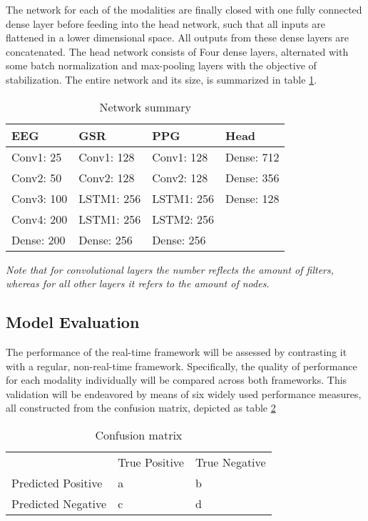 \documentclass{article}
\begin{document}
The network for each of the modalities are finally closed with one fully connected dense layer before feeding into the head network, such that all inputs are flattened in a lower dimensional space. All outputs from these dense layers are concatenated. The head network consists of Four dense layers, alternated with some batch normalization and max-pooling layers with the objective of stabilization. The entire network and its  size, is summarized in table \ref{table:networksummary}.
\bigskip

\bgroup
\def\arraystretch{1.6}%
\begin{table}[h]
\centering
\caption{Network summary	}
\label{table:networksummary}
\begin{tabular}{llll}
EEG        & GSR        & PPG        & Head       \\ \hline
Conv1: 25  & Conv1: 128 & Conv1: 128 & Dense: 712 \\
Conv2: 50  & Conv2: 128 & Conv2: 128 & Dense: 356 \\
Conv3: 100 & LSTM1: 256 & LSTM1: 256 & Dense: 128 \\
Conv4: 200 & LSTM1: 256 & LSTM2: 256 &            \\
Dense: 200 & Dense: 256 & Dense: 256 &            \\ \hline
\end{tabular}
\vspace{2ex}

{\raggedright \textit{Note that for convolutional layers the number reflects the amount of filters, whereas for all other layers it refers to the amount of nodes.} \par}
\end{table}
\egroup


\subsection{Model Evaluation}
The performance of the real-time framework will be assessed by contrasting it with a regular, non-real-time framework. Specifically, the quality of performance for each modality individually will be compared across both frameworks. This validation will be endeavored by means of six widely used performance measures, all constructed from the confusion matrix, depicted as table  \ref{table:confusion}  
\bigskip
\bgroup
\def\arraystretch{1.6}%
\begin{table}[h]
\centering
\caption{Confusion matrix}
\label{table:confusion}
\begin{tabular}{lll}
                                        & True Positive          & True Negative          \\ \cline{2-3} 
\multicolumn{1}{l|}{Predicted Positive} & \multicolumn{1}{l|}{a} & \multicolumn{1}{l|}{b} \\ \cline{2-3} 
\multicolumn{1}{l|}{Predicted Negative} & \multicolumn{1}{l|}{c} & \multicolumn{1}{l|}{d} \\ \cline{2-3} 
\end{tabular}
\end{table}
\egroup
\end{document}
